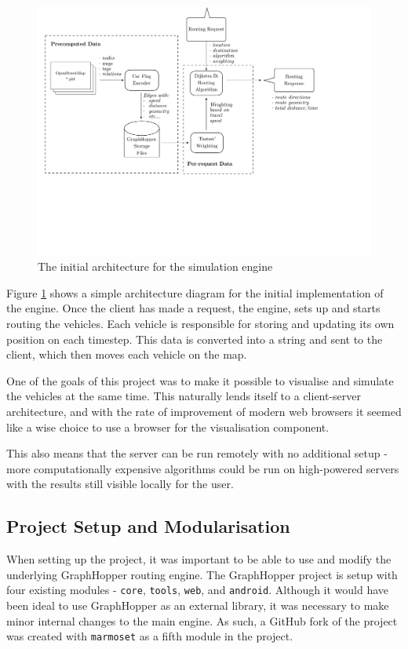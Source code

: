\documentclass[ %
                    author={Alexander Hill},
                supervisor={Dr. Benjamin Sach},
                    degree={MEng},
                     title={MARMOSET},
                  subtitle={Multi-Agent Route Management using Online Simulation for Efficient Transportation},
                      type={research},
                      year={2016} ]{dissertation}
\begin{document}
\begin{figure}[h]
    \centering
    \includegraphics[scale=0.5,page=2,clip,trim=0 17cm 3cm 0]{architecture}
    \caption{The initial architecture for the simulation engine}\label{fig:init-arch}
\end{figure}

Figure \ref{fig:init-arch} shows a simple architecture diagram for the initial
implementation of the engine. Once the client has made a request, the engine,
sets up and starts routing the vehicles. Each vehicle is responsible for storing
and updating its own position on each timestep. This data is converted into a
string and sent to the client, which then moves each vehicle on the map.

One of the goals of this project was to make it possible to visualise and
simulate the vehicles at the same time. This naturally lends itself to a
client-server architecture, and with the rate of improvement of modern web
browsers it seemed like a wise choice to use a browser for the visualisation
component.

This also means that the server can be run remotely with no additional setup -
more computationally expensive algorithms could be run on high-powered servers
with the results still visible locally for the user.

\subsection{Project Setup and Modularisation}

When setting up the project, it was important to be able to use and modify the
underlying GraphHopper routing engine. The GraphHopper project is setup with
four existing modules - \texttt{core}, \texttt{tools}, \texttt{web}, and
\texttt{android}. Although it would have been ideal to use GraphHopper as an
external library, it was necessary to make minor internal changes to the main
engine. As such, a GitHub fork of the project was created with \texttt{marmoset}
as a fifth module in the project.
\end{document}
